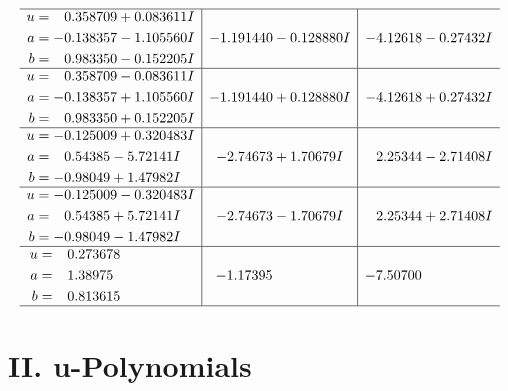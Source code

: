 \documentclass[1p]{elsarticle_modified}
\theoremstyle{definition}
\begin{document}
$$\begin{array}{c|c|c}
 \hline 
\begin{aligned}
u &= \phantom{-}0.358709 + 0.083611 I \\
a &= -0.138357 - 1.105560 I \\
b &= \phantom{-}0.983350 - 0.152205 I\end{aligned}
 & -1.191440 - 0.128880 I & -4.12618 - 0.27432 I \\ \hline\begin{aligned}
u &= \phantom{-}0.358709 - 0.083611 I \\
a &= -0.138357 + 1.105560 I \\
b &= \phantom{-}0.983350 + 0.152205 I\end{aligned}
 & -1.191440 + 0.128880 I & -4.12618 + 0.27432 I \\ \hline\begin{aligned}
u &= -0.125009 + 0.320483 I \\
a &= \phantom{-}0.54385 - 5.72141 I \\
b &= -0.98049 + 1.47982 I\end{aligned}
 & -2.74673 + 1.70679 I & \phantom{-}2.25344 - 2.71408 I \\ \hline\begin{aligned}
u &= -0.125009 - 0.320483 I \\
a &= \phantom{-}0.54385 + 5.72141 I \\
b &= -0.98049 - 1.47982 I\end{aligned}
 & -2.74673 - 1.70679 I & \phantom{-}2.25344 + 2.71408 I \\ \hline\begin{aligned}
u &= \phantom{-}0.273678\phantom{ +0.000000I} \\
a &= \phantom{-}1.38975\phantom{ +0.000000I} \\
b &= \phantom{-}0.813615\phantom{ +0.000000I}\end{aligned}
 & -1.17395\phantom{ +0.000000I} & -7.50700\phantom{ +0.000000I}\\
 \hline 
 \end{array}$$\newpage
\newpage\renewcommand{\arraystretch}{1}
\centering \section*{ II. u-Polynomials}
\end{document}
